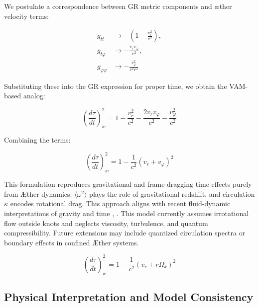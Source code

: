 We postulate a correspondence between GR metric components and æther velocity terms:

\begin{equation}
\begin{aligned}
g_{tt} &\rightarrow -\left(1 - \frac{v_r^2}{c^2}\right), \\
g_{t\varphi} &\rightarrow -\frac{v_r v_\varphi}{c^2}, \\
g_{\varphi\varphi} &\rightarrow -\frac{v_\varphi^2}{c^2 r^2}
\end{aligned}
\label{eq:VAM_metric_terms}
\end{equation}

Substituting these into the GR expression for proper time, we obtain the VAM-based analog:

\begin{equation}
\left( \frac{d\tau}{dt} \right)^2_{\text{\ae}} = 1 - \frac{v_r^2}{c^2} - \frac{2v_r v_\varphi}{c^2} - \frac{v_\varphi^2}{c^2}
\label{eq:VAM_proper_time}
\end{equation}

Combining the terms:

\begin{equation}
\left( \frac{d\tau}{dt} \right)^2_{\text{\ae}} = 1 - \frac{1}{c^2}(v_r + v_\varphi)^2
\label{eq:VAM_proper_time_combined}
\end{equation}

This formulation reproduces gravitational and frame-dragging time effects purely from Æther dynamics: $\langle \omega^2 \rangle$ plays the role of gravitational redshift, and circulation $\kappa$ encodes rotational drag. This approach aligns with recent fluid-dynamic interpretations of gravity and time \cite{barcelo2011analogue}, \cite{fedi2017gravity}.
This model currently assumes irrotational flow outside knots and neglects viscosity, turbulence, and quantum compressibility. Future extensions may include quantized circulation spectra or boundary effects in confined Æther systems.

\begin{equation}
\boxed{\left( \frac{d\tau}{dt} \right)^2_{\text{\ae}} = 1 - \frac{1}{c^2}(v_r + r\Omega_k)^2}
\label{eq:VAM_proper_time_final}
\end{equation}

\subsection{Physical Interpretation and Model Consistency}

